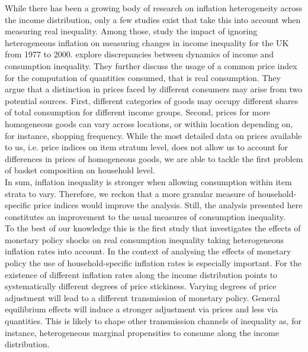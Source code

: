 \documentclass{article}
\begin{document}
While there  has been a growing body of research on inflation heterogeneity across the income distribution, only a few studies exist that take this into account when measuring real inequality. Among those, \cite{Crawford2002DistributionalInflation} study the impact  of ignoring heterogeneous inflation on measuring changes in income inequality for the UK from 1977 to 2000. \cite{AttanasioO.2016ConsumptionInequality}explore discrepancies between dynamics of income and consumption inequality. They further discuss the usage of a common price index for the computation of quantities consumed, that is real consumption. They argue that a distinction in prices faced by different consumers may arise from two potential sources. First, different categories of goods may occupy different shares of total consumption for different income groups. Second, prices for more homogeneous goods can vary across locations, or within location depending on, for instance, shopping frequency. %
While the most detailed data on prices available to us, i.e. price indices on item stratum level, does not allow us to account for differences in prices of homogeneous goods, we are able to  tackle the first problem of  basket composition on household level. 
\\ 
 In sum, inflation inequality is stronger when allowing consumption within item strata to vary. Therefore, we reckon that a more granular measure of household-specific price indices would improve the analysis. Still, the analysis presented here constitutes an improvement to the usual measures of consumption inequality. 
\\
To the best of our knowledge this is the first study that investigates the effects of monetary policy shocks on real consumption inequality taking heterogeneous inflation rates into account. In the context of analysing the effects of monetary policy the use of household-specific inflation rates is especially important. For the existence of different inflation rates along the income distribution points to systematically different degrees of price stickiness. 
Varying degrees of price adjustment will lead to a different transmission of monetary policy. General equilibrium effects will induce a stronger adjustment via prices and less via quantities. This is likely to shape other transmission channels of inequality as, for instance, heterogeneous marginal propensities to consume along the income distribution.
\end{document}
